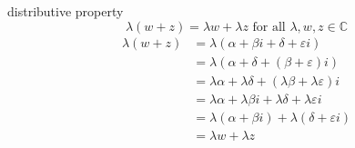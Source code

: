 \documentclass[11pt]{book}
\begin{document}
\begin{ver}
    distributive property
    \begin{equation*}
        \lambda\left(w + z\right) = \lambda w + \lambda z \text{ for all  } \lambda, w, z \in \mathbb{C}    
    \end{equation*}
    \begin{align*}
        \lambda\left( w + z \right) &= \lambda \left( \alpha + \beta i + \delta + \varepsilon i \right) \\
                                    &= \lambda\left(\alpha + \delta + \left( \beta + \varepsilon \right)i\right) \\
                                    &= \lambda \alpha + \lambda \delta + \left( \lambda \beta + \lambda\varepsilon \right)i \\
                                    &= \lambda \alpha + \lambda \beta i + \lambda \delta + \lambda \varepsilon i \\
                                    &= \lambda \left( \alpha + \beta i \right) + \lambda \left( \delta + \varepsilon i \right) \\
                                    &= \lambda w + \lambda z
    \end{align*}
\end{ver}





\end{document}
